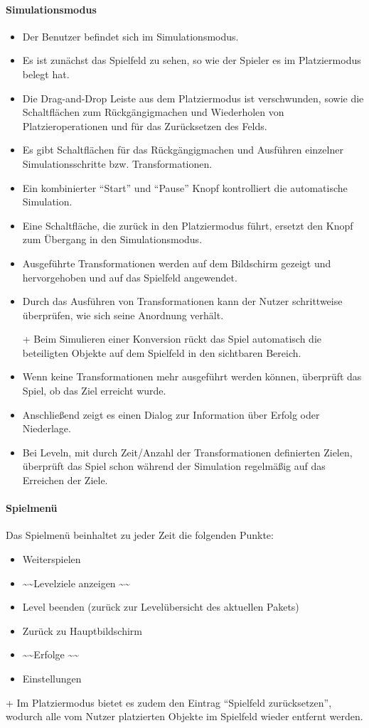 \paragraph{Simulationsmodus}\mbox{}\newline
\begin{itemize}
\item Der Benutzer befindet sich im Simulationsmodus.
\item Es ist zunächst das Spielfeld zu sehen, so wie der Spieler es im Platziermodus belegt hat.
\item Die Drag-and-Drop Leiste aus dem Platziermodus ist verschwunden, sowie die 
Schaltflächen zum Rückgängigmachen und Wiederholen von 
Platzieroperationen und für das Zurücksetzen des Felds.
\item Es gibt Schaltflächen für das Rückgängigmachen und Ausführen 
einzelner Simulationsschritte bzw. Transformationen.
\item Ein kombinierter ``Start'' und ``Pause'' Knopf kontrolliert die automatische Simulation.
\item Eine Schaltfläche, die zurück in den Platziermodus führt, ersetzt den Knopf zum Übergang 
in den Simulationsmodus.
\item Ausgeführte Transformationen werden auf dem Bildschirm gezeigt und hervorgehoben und auf das Spielfeld angewendet.
\item Durch das Ausführen von Transformationen kann der Nutzer schrittweise
überprüfen, wie sich seine Anordnung verhält.
\item[+] Beim Simulieren einer Konversion rückt das Spiel automatisch die beteiligten Objekte auf dem Spielfeld in den sichtbaren Bereich.
\item  Wenn keine Transformationen mehr ausgeführt werden können, überprüft das Spiel, ob das Ziel erreicht
wurde.
\item Anschließend zeigt es einen Dialog zur Information über Erfolg oder Niederlage.
\item Bei Leveln, mit durch Zeit/Anzahl der Transformationen definierten Zielen,
überprüft das Spiel schon während der Simulation regelmäßig auf das Erreichen
der Ziele.
\end{itemize}

\paragraph{Spielmenü}\mbox{}\newline
Das Spielmenü beinhaltet zu jeder Zeit die folgenden Punkte:
\begin{itemize}
	\item Weiterspielen
	\item \textasciitilde\textasciitilde Levelziele anzeigen \textasciitilde\textasciitilde
	\item Level beenden (zurück zur Levelübersicht des aktuellen Pakets)
	\item Zurück zu Hauptbildschirm
	\item \textasciitilde\textasciitilde Erfolge \textasciitilde\textasciitilde
	\item Einstellungen
\end{itemize}

+ Im Platziermodus bietet es zudem den Eintrag ``Spielfeld zurücksetzen'',
wodurch alle vom Nutzer platzierten Objekte im Spielfeld wieder entfernt werden.
